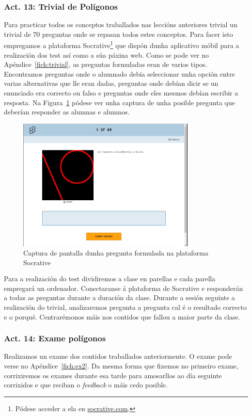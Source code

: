 \subsubsection{Act. 13: Trivial de Polígonos}\label{act13}
Para practicar todos os conceptos traballados nas leccións anteriores trivial un trivial de 70 preguntas onde se repasan todos estes conceptos. Para facer isto empregamos a plataforma Socrative\footnote{Pódese acceder a ela en \href{http://www.socrative.com/}{socrative.com}.} que dispón dunha aplicativo móbil para a realización dos test así como a súa páxina web. Como se pode ver no Apéndice~\ref{fich:trivial}, as preguntas formuladas eran de varios tipos. Encontramos preguntas onde o alumnado debía seleccionar unha opción entre varias alternativas que lle eran dadas, preguntas onde debían dicir se un enunciado era correcto ou falso e preguntas onde eles mesmos debían escribir a resposta. Na Figura~\ref{fig:act13} pódese ver unha captura de unha posible pregunta que deberían responder as alumnas e alumnos.

\begin{figure}[h!]
  \centering
  \includegraphics[width=0.8\textwidth]{img/socrative.png}
  \caption{Captura de pantalla dunha pregunta formulada na plataforma Socrative}\label{fig:act13}
\end{figure}

Para a realización do test dividiremos a clase en parellas e cada parella empregará un ordenador. Conectaranse á plataforma de Socrative e responderán a todas as preguntas durante a duración da clase. Durante a sesión seguinte a realización do trivial, analizaremos pregunta a pregunta cal é o resultado correcto e o porqué. Centrarémonos máis nos contidos que fallou a maior parte da clase.

\subsubsection{Act. 14: Exame polígonos}
Realizamos un exame dos contidos traballados anteriormente. O exame pode verse no Apéndice~\ref{fich:ex2}. Da mesma forma que fixemos no primeiro exame, corrixiremos os exames durante esa tarde para amosarllos ao día seguinte corrixidos e que reciban o \emph{feedback} o máis cedo posible.


